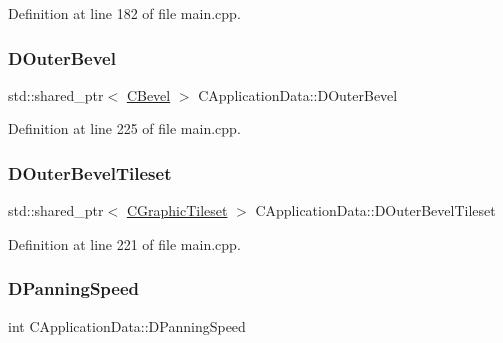 Definition at line 182 of file main.\+cpp.

\hypertarget{classCApplicationData_abc2b04aa05148da81145ff6d6bc2bf01}{}\label{classCApplicationData_abc2b04aa05148da81145ff6d6bc2bf01} 
\subsubsection{\texorpdfstring{D\+Outer\+Bevel}{DOuterBevel}}
{\footnotesize\ttfamily std\+::shared\+\_\+ptr$<$ \hyperlink{classCBevel}{C\+Bevel} $>$ C\+Application\+Data\+::\+D\+Outer\+Bevel\hspace{0.3cm}{\ttfamily [protected]}}



Definition at line 225 of file main.\+cpp.

\hypertarget{classCApplicationData_ac1ebf4e2d6c8a445c7e8de643a348093}{}\label{classCApplicationData_ac1ebf4e2d6c8a445c7e8de643a348093} 
\subsubsection{\texorpdfstring{D\+Outer\+Bevel\+Tileset}{DOuterBevelTileset}}
{\footnotesize\ttfamily std\+::shared\+\_\+ptr$<$ \hyperlink{classCGraphicTileset}{C\+Graphic\+Tileset} $>$ C\+Application\+Data\+::\+D\+Outer\+Bevel\+Tileset\hspace{0.3cm}{\ttfamily [protected]}}



Definition at line 221 of file main.\+cpp.

\hypertarget{classCApplicationData_a9e07e8374b20abfbb57f656e92be8404}{}\label{classCApplicationData_a9e07e8374b20abfbb57f656e92be8404} 
\subsubsection{\texorpdfstring{D\+Panning\+Speed}{DPanningSpeed}}
{\footnotesize\ttfamily int C\+Application\+Data\+::\+D\+Panning\+Speed\hspace{0.3cm}{\ttfamily [protected]}}



